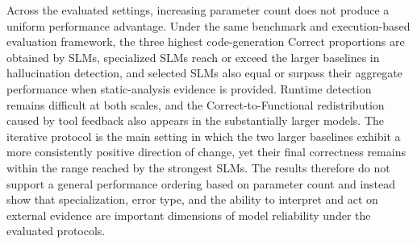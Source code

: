Across the evaluated settings, increasing parameter count does not produce a uniform performance advantage. Under the same benchmark and execution-based evaluation framework, the three highest code-generation Correct proportions are obtained by SLMs, specialized SLMs reach or exceed the larger baselines in hallucination detection, and selected SLMs also equal or surpass their aggregate performance when static-analysis evidence is provided. Runtime detection remains difficult at both scales, and the Correct-to-Functional redistribution caused by tool feedback also appears in the substantially larger models. The iterative protocol is the main setting in which the two larger baselines exhibit a more consistently positive direction of change, yet their final correctness remains within the range reached by the strongest SLMs. The results therefore do not support a general performance ordering based on parameter count and instead show that specialization, error type, and the ability to interpret and act on external evidence are important dimensions of model reliability under the evaluated protocols.